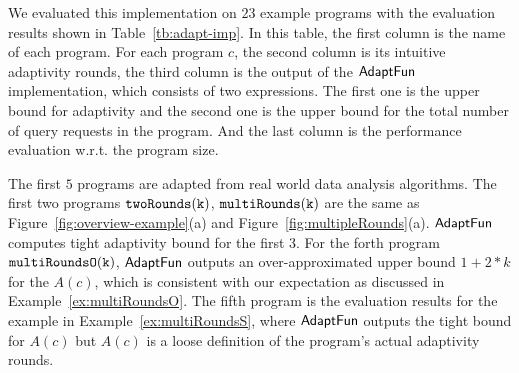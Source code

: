 
We evaluated this implementation on $23$ example programs with the evaluation results shown in Table~\ref{tb:adapt-imp}.
In this table,
the first column is the name of each program.
For each program $c$, the second column is its intuitive adaptivity rounds,
the third column is the output of the $\textsf{AdaptFun}$ implementation, which consists of two expressions.
The first one is the upper bound for adaptivity and the second one is the 
upper bound for the total number of query requests in the program. And the last column is the performance evaluation w.r.t. the program size.


    The first $5$ programs are adapted from real world data analysis algorithms.
    The first two programs $\mathtt{twoRounds(k)}$, $ \mathtt{multiRounds(k)}$ are the same as Figure~\ref{fig:overview-example}(a) and Figure~\ref{fig:multipleRounds}(a).
    $\textsf{AdaptFun}$ computes tight adaptivity bound for the first 3.
For the forth program $\mathtt{multiRoundsO(k)}$, $\textsf{AdaptFun}$ outputs an over-approximated upper bound $1 + 2*k$ for the $A(c)$, which is consistent with our expectation as discussed in Example~\ref{ex:multiRoundsO}. 
The fifth program is the evaluation results for the example in Example~\ref{ex:multiRoundsS}, where $\textsf{AdaptFun}$ outputs the tight bound for $A(c)$ but $A(c)$ is a loose definition of the program's actual adaptivity rounds.
%

